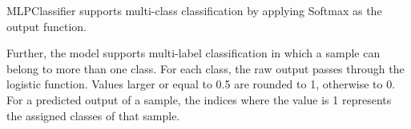 \begin{itemize}
\tab  MLPClassifier supports multi-class classification by applying Softmax as the output function.

Further, the model supports multi-label classification in which a sample can belong to more than one class. For each class, the raw output passes through the logistic function. Values larger or equal to 0.5 are rounded to 1, otherwise to 0. For a predicted output of a sample, the indices where the value is 1 represents the assigned classes of that sample. \\

\end{itemize}